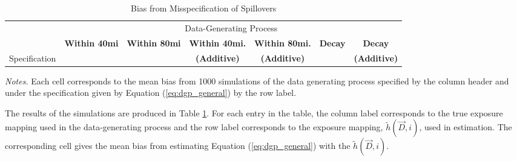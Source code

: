 \documentclass[11pt]{article}
\begin{document}
\begin{table}[!tb]
    \caption{Bias from Misspecification of Spillovers}
    \label{tab:misspecification}

    \begin{adjustbox}{width = 1.1\textwidth, center}
        \begin{threeparttable}
            \begin{tabular}{@{} l rrrrrr @{}}
                \toprule
                & \multicolumn{6}{c}{Data-Generating Process} \\
                \cmidrule{2-7}

                & \multicolumn{1}{c}{\textbf{Within 40mi}} & \multicolumn{1}{c}{\textbf{Within 80mi}} & \multicolumn{1}{c}{\textbf{Within 40mi.}} & \multicolumn{1}{c}{\textbf{Within 80mi.}} & \multicolumn{1}{c}{\textbf{Decay}} & \multicolumn{1}{c}{\textbf{Decay}} \\
                Specification & & & \multicolumn{1}{c}{\textbf{(Additive)}} & \multicolumn{1}{c}{\textbf{(Additive)}} & & \multicolumn{1}{c}{\textbf{(Additive)}} \\

 
                \midrule
                
                
                
                
                \bottomrule
            \end{tabular}
            
            \begin{tablenotes}\footnotesize
                \item \textit{Notes.} Each cell corresponds to the mean bias from 1000 simulations of the data generating process specified by the column header and under the specification given by Equation (\ref{eq:dgp_general}) by the row label. 
            \end{tablenotes}
        \end{threeparttable}
    \end{adjustbox}
\end{table}

The results of the simulations are produced in Table \ref{tab:misspecification}. For each entry in the table, the column label corresponds to the true exposure mapping used in the data-generating process and the row label corresponds to the exposure mapping, $\tilde{h}(\vec{D}, i)$, used in estimation.  The corresponding cell gives the mean bias from estimating Equation (\ref{eq:dgp_general}) with the $\tilde{h}(\vec{D}, i)$.
\end{document}
